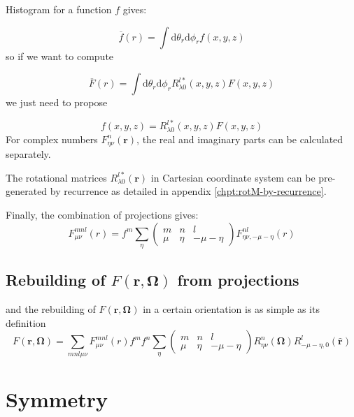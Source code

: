 Histogram for a function $f$ gives:

\begin{equation}
\overline{f}(r)=\int\mathrm{d}\theta_{r}\mathrm{d}\phi_{r}f(x,y,z)
\end{equation}
so if we want to compute

\begin{equation}
\overline{F}(r)=\int\mathrm{d}\theta_{r}\mathrm{d}\phi_{r}R_{\lambda0}^{l*}(x,y,z)F(x,y,z)
\end{equation}
we just need to propose 

\begin{equation}
f(x,y,z)=R_{\lambda0}^{l*}(x,y,z)F(x,y,z)
\end{equation}
For complex numbers $F_{\eta\nu}^{n}(\mathbf{r})$, the real and imaginary
parts can be calculated separately.

The rotational matrices $R_{\lambda0}^{l*}(\mathbf{r})$ in Cartesian
coordinate system can be pre-generated by recurrence as detailed in
appendix \ref{chpt:rotM-by-recurrence}. 

Finally, the combination of projections gives:
\begin{equation}
F_{\mu\nu}^{mnl}(r)=f^{m}\sum_{\eta}\left(\begin{array}{ccc}
m & n & l\\
\mu & \eta & -\mu-\eta
\end{array}\right)F_{\eta\nu,-\mu-\eta}^{nl}(r)
\end{equation}


\subsection*{Rebuilding of $F(\mathbf{r},\mathbf{\Omega})$ from projections}

and the rebuilding of $F(\mathbf{r},\mathbf{\Omega})$ in a certain
orientation is as simple as its definition
\begin{equation}
F(\mathbf{r},\mathbf{\Omega})=\sum_{mnl\mu\nu}F_{\mu\nu}^{mnl}(r)f^{m}f^{n}\sum_{\eta}\left(\begin{array}{ccc}
m & n & l\\
\mu & \eta & -\mu-\eta
\end{array}\right)R_{\eta\nu}^{n}(\mathbf{\Omega})R_{-\mu-\eta,0}^{l}(\mathbf{\hat{r}})\label{eq:bwd-1}
\end{equation}


\section{Symmetry\label{sec:Symmetry-rot_invar}}

